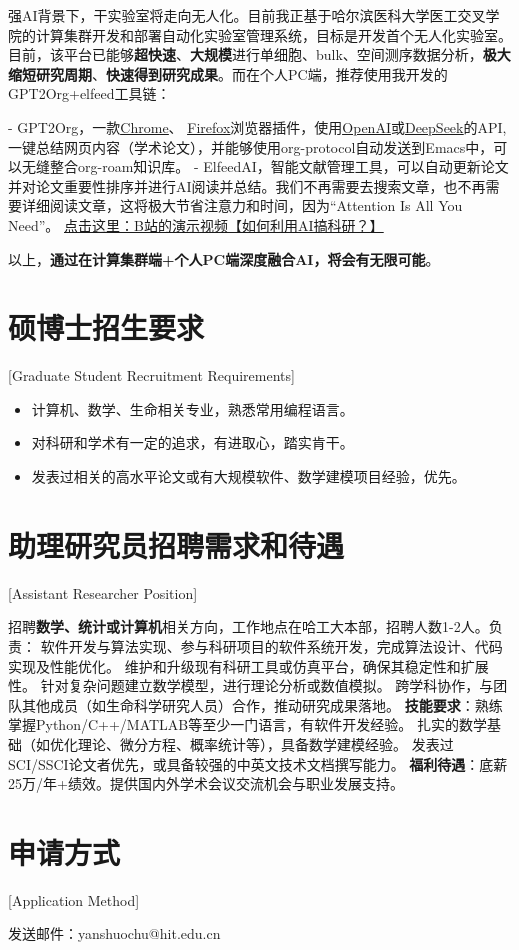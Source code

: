 强AI背景下，干实验室将走向无人化。目前我正基于哈尔滨医科大学医工交叉学院的计算集群开发和部署自动化实验室管理系统，目标是开发首个无人化实验室。目前，该平台已能够\textbf{超快速}、\textbf{大规模}进行单细胞、bulk、空间测序数据分析，\textbf{极大缩短研究周期}、\textbf{快速得到研究成果}。而在个人PC端，推荐使用我开发的GPT2Org+elfeed工具链：

- GPT2Org，一款\href{https://chromewebstore.google.com/detail/gpt2org/nedljjoclmlgpobfohcnanjipnblgjbo?pli=1}{\uline{Chrome}}、
\href{https://addons.mozilla.org/en-US/firefox/addon/gpt2org/}{\uline{Firefox}}浏览器插件，使用\href{https://platform.openai.com/api-keys}{\uline{OpenAI}}或\href{https://platform.deepseek.com/api_keys}{\uline{DeepSeek}}的API,一键总结网页内容（学术论文），并能够使用org-protocol自动发送到Emacs中，可以无缝整合org-roam知识库。
- ElfeedAI，智能文献管理工具，可以自动更新论文并对论文重要性排序并进行AI阅读并总结。我们不再需要去搜索文章，也不再需要详细阅读文章，这将极大节省注意力和时间，因为“Attention Is All You Need”。
\href{https://www.bilibili.com/video/BV1dModYPE3c/?share_source=copy_web&vd_source=d6f2f3603fdf3b24c20399fbfd25df0d}{\uline{点击这里：B站的演示视频【如何利用AI搞科研？】}}

以上，\textbf{通过在计算集群端+个人PC端深度融合AI，将会有无限可能}。

\section{硕博士招生要求}[Graduate Student Recruitment Requirements]

\begin{itemize}
\item 计算机、数学、生命相关专业，熟悉常用编程语言。
\item 对科研和学术有一定的追求，有进取心，踏实肯干。
\item 发表过相关的高水平论文或有大规模软件、数学建模项目经验，优先。
\end{itemize}

\section{助理研究员招聘需求和待遇}[Assistant Researcher Position]

招聘\textbf{数学、统计或计算机}相关方向，工作地点在哈工大本部，招聘人数1-2人。负责：
软件开发与算法实现、参与科研项目的软件系统开发，完成算法设计、代码实现及性能优化。
维护和升级现有科研工具或仿真平台，确保其稳定性和扩展性。
针对复杂问题建立数学模型，进行理论分析或数值模拟。
跨学科协作，与团队其他成员（如生命科学研究人员）合作，推动研究成果落地。
\textbf{技能要求}：熟练掌握Python/C++/MATLAB等至少一门语言，有软件开发经验。
扎实的数学基础（如优化理论、微分方程、概率统计等），具备数学建模经验。
发表过SCI/SSCI论文者优先，或具备较强的中英文技术文档撰写能力。
\textbf{福利待遇}：底薪25万/年+绩效。提供国内外学术会议交流机会与职业发展支持。

\section{申请方式}[Application Method]

发送邮件：yanshuochu@hit.edu.cn

